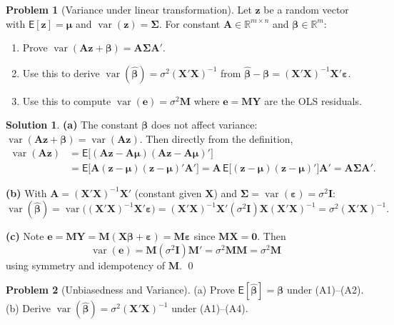 \documentclass[12pt,a4paper]{article}
\theoremstyle{definition}
\newtheorem{exercise}{Problem}
\newtheorem*{solution*}{Solution}
\newcommand\expc{\mathsf{E}}
\DeclareMathOperator\var{var}
\newcommand{\bX}{\mathbf{X}}
\newcommand{\bY}{\mathbf{Y}}
\def\bb{\boldsymbol{\beta}}
\newcommand{\be}{\boldsymbol{\varepsilon}}
\newcommand{\bI}{\mathbf{I}}
\newcommand{\bM}{\mathbf{M}}
\newcommand{\bzero}{\mathbf{0}}
\newcommand{\bz}{\mathbf{z}}
\newcommand{\bA}{\mathbf{A}}
\newcommand{\Real}{\mathbb{R}}
\begin{document}
\begin{exercise}[Variance under linear transformation]\label{prob:A5}
Let $\bz$ be a random vector with $\expc[\bz] = \boldsymbol\mu$ and $\var(\bz) = \boldsymbol\Sigma$. For constant $\bA \in \Real^{m\times n}$ and $\bb \in \Real^m$:
\begin{enumerate}[label=(\alph*),nosep]
\item Prove $\var(\bA\bz + \bb) = \bA\boldsymbol\Sigma\bA'$.
\item Use this to derive $\var(\hat{\bb}) = \sigma^2(\bX'\bX)^{-1}$ from $\hat{\bb} - \bb = (\bX'\bX)^{-1}\bX'\be$.
\item Use this to compute $\var(\mathbf{e}) = \sigma^2\bM$ where $\mathbf{e} = \bM\bY$ are the OLS residuals.
\end{enumerate}
\end{exercise}

\begin{solution*}
\textbf{(a)} The constant $\bb$ does not affect variance: $\var(\bA\bz + \bb) = \var(\bA\bz)$. Then directly from the definition,
\begin{align*}
\var(\bA\bz) &= \expc\bigl[(\bA\bz - \bA\boldsymbol\mu)(\bA\bz - \bA\boldsymbol\mu)'\bigr] \\
&= \expc\bigl[\bA(\bz-\boldsymbol\mu)(\bz-\boldsymbol\mu)'\bA'\bigr] = \bA\,\expc\bigl[(\bz-\boldsymbol\mu)(\bz-\boldsymbol\mu)'\bigr]\bA' = \bA\boldsymbol\Sigma\bA'.
\end{align*}

\textbf{(b)} With $\bA = (\bX'\bX)^{-1}\bX'$ (constant given $\bX$) and $\boldsymbol\Sigma = \var(\be) = \sigma^2\bI$:
\[
\var(\hat{\bb}) = \var\bigl((\bX'\bX)^{-1}\bX'\be\bigr) = (\bX'\bX)^{-1}\bX'(\sigma^2\bI)\bX(\bX'\bX)^{-1} = \sigma^2(\bX'\bX)^{-1}.
\]

\textbf{(c)} Note $\mathbf{e} = \bM\bY = \bM(\bX\bb + \be) = \bM\be$ since $\bM\bX = \bzero$. Then
\[
\var(\mathbf{e}) = \bM(\sigma^2\bI)\bM' = \sigma^2\bM\bM = \sigma^2\bM
\]
using symmetry and idempotency of $\bM$. \qed
\end{solution*}

\begin{exercise}[Unbiasedness and Variance]\label{prob:A6}
(a) Prove $\expc[\hat{\bb}] = \bb$ under (A1)--(A2).\\
(b) Derive $\var(\hat{\bb}) = \sigma^2(\bX'\bX)^{-1}$ under (A1)--(A4).
\end{exercise}
\end{document}

